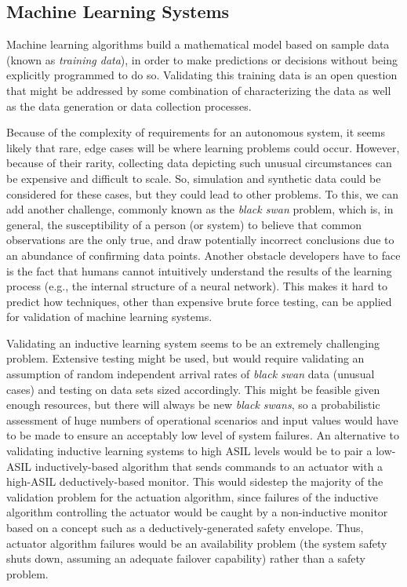 \documentclass[a4paper, 10pt]{article}
\begin{document}
\subsection{Machine Learning Systems}
Machine learning algorithms build a mathematical model based on sample data (known as \textit{training data}), in order to make predictions or decisions without being explicitly programmed to do so. Validating this training data is an open question that might be addressed by some combination of characterizing the data as well as the data generation or data collection processes.

Because of the complexity of requirements for an autonomous system, it seems likely that rare, edge cases will be where learning problems could occur. However, because of their rarity, collecting data depicting such unusual circumstances can be expensive and difficult to scale. So, simulation and synthetic data could be considered for these cases, but they could lead to other problems. To this, we can add another challenge, commonly known as the \textit{black swan} problem, which is, in general, the susceptibility of a person (or system) to believe that common observations are the only true, and draw potentially incorrect conclusions due to an abundance of confirming
data points. Another obstacle developers have to face is the fact that humans cannot intuitively understand the results of the learning process (e.g., the internal structure of a neural network). This makes it hard to predict how techniques, other than expensive brute force testing, can be applied for validation of machine learning systems.

Validating an inductive learning system seems to be an extremely challenging problem. Extensive testing might be used, but would require validating an assumption of random independent arrival rates of \textit{black swan} data (unusual cases) and testing on data sets sized accordingly. This might be feasible given enough resources, but there will always be new \textit{black swans}, so a probabilistic assessment of huge numbers of operational scenarios and input values would have to be made to ensure an acceptably low level of system failures. An alternative to validating inductive learning systems to high ASIL levels would be to pair a low-ASIL inductively-based algorithm that sends commands to an actuator with a high-ASIL deductively-based monitor. This would sidestep the majority of the validation problem for the actuation algorithm, since failures of the inductive algorithm controlling the actuator would be caught by a non-inductive monitor based on a concept such as a deductively-generated safety envelope. Thus, actuator algorithm failures would be an availability problem (the system safety shuts down, assuming an adequate failover capability) rather than a safety problem.
\end{document}
